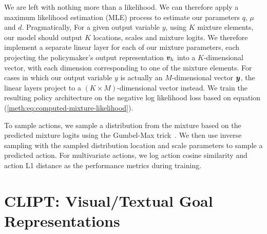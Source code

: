 \documentclass[../main.tex]{subfiles}
\begin{document}
We are left with nothing more than a likelihood. We can therefore apply a maximum likelihood
estimation (MLE) process to estimate our parameters $q$, $\mu$ and $d$. Pragmatically, For a given
output variable $y$, using $K$ mixture elements, our model should output $K$ locations, scales and
mixture logits. We therefore implement a separate linear layer for each of our mixture parameters,
each projecting the policymaker's output representation $\bm v_h$ into a $K$-dimensional vector,
with each dimension corresponding to one of the mixture elements. For cases in which our output
variable $y$ is actually an $M$-dimensional vector $\bm y$, the linear layers project to a $(K
	\times M)$-dimensional vector instead. We train the resulting policy architecture on the negative
log likelihood loss based on equation (\ref{meth:eq:computed-mixture-likelihood}).

To sample actions, we sample a distribution from the mixture based on the predicted mixture logits
using the Gumbel-Max trick~\citep{gumbel_statistical_1954}. We then use inverse sampling with the
sampled distribution location and scale parameters to sample a predicted action. For multivariate
actions, we log action cosine similarity and action L1 distance as the performance metrics during
training.


\section{CLIPT: Visual/Textual Goal Representations}\label{meth:sec:clipt}

\end{document}
